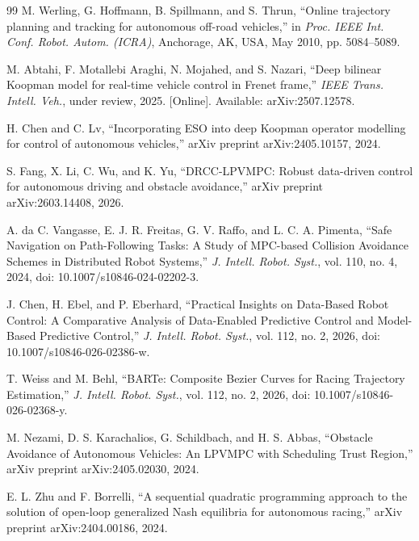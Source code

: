 \documentclass[pdflatex,sn-mathphys,Numbered]{sn-jnl}
\numberwithin{equation}{section}
\begin{document}
\begin{thebibliography}{99}
		M. Werling, G. Hoffmann, B. Spillmann, and S. Thrun,
		``Online trajectory planning and tracking for autonomous off-road vehicles,''
		in \textit{Proc. IEEE Int. Conf. Robot. Autom. (ICRA)}, Anchorage, AK, USA, May 2010, pp. 5084--5089.
		
		M. Abtahi, F. Motallebi Araghi, N. Mojahed, and S. Nazari,
		``Deep bilinear Koopman model for real-time vehicle control in Frenet frame,''
		\textit{IEEE Trans. Intell. Veh.}, under review, 2025.
		[Online]. Available: arXiv:2507.12578.
		
		H. Chen and C. Lv,
		``Incorporating ESO into deep Koopman operator modelling for control of autonomous vehicles,''
		arXiv preprint arXiv:2405.10157, 2024.
		
		S. Fang, X. Li, C. Wu, and K. Yu,
		``DRCC-LPVMPC: Robust data-driven control for autonomous driving and obstacle avoidance,''
		arXiv preprint arXiv:2603.14408, 2026.

		A. da C. Vangasse, E. J. R. Freitas, G. V. Raffo, and L. C. A. Pimenta,
		``Safe Navigation on Path-Following Tasks: A Study of MPC-based Collision Avoidance Schemes in Distributed Robot Systems,''
		\textit{J. Intell. Robot. Syst.}, vol. 110, no. 4, 2024, doi: 10.1007/s10846-024-02202-3.

		J. Chen, H. Ebel, and P. Eberhard,
		``Practical Insights on Data-Based Robot Control: A Comparative Analysis of Data-Enabled Predictive Control and Model-Based Predictive Control,''
		\textit{J. Intell. Robot. Syst.}, vol. 112, no. 2, 2026, doi: 10.1007/s10846-026-02386-w.

		T. Weiss and M. Behl,
		``BARTe: Composite Bezier Curves for Racing Trajectory Estimation,''
		\textit{J. Intell. Robot. Syst.}, vol. 112, no. 2, 2026, doi: 10.1007/s10846-026-02368-y.
		
		M. Nezami, D. S. Karachalios, G. Schildbach, and H. S. Abbas,
		``Obstacle Avoidance of Autonomous Vehicles: An LPVMPC with Scheduling Trust Region,''
		arXiv preprint arXiv:2405.02030, 2024.
		
		E. L. Zhu and F. Borrelli,
		``A sequential quadratic programming approach to the solution of open-loop generalized Nash equilibria for autonomous racing,''
		arXiv preprint arXiv:2404.00186, 2024.
		

\end{thebibliography}
\end{document}
